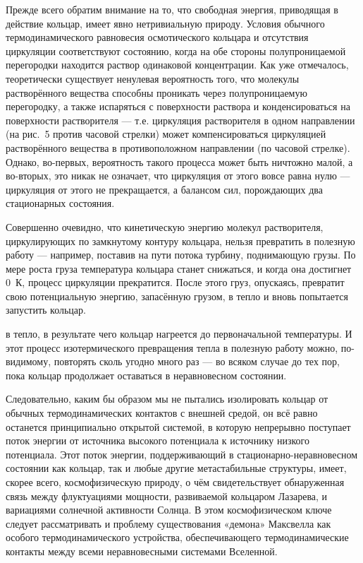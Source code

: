 \documentclass[12pt,a4paper]{article}
\begin{document}
Прежде всего обратим внимание на то, что свободная энергия, приводящая в
действие кольцар, имеет явно нетривиальную природу. Условия обычного
термодинамического равновесия осмотического кольцара и отсутствия циркуляции
соответствуют состоянию, когда на обе стороны полупроницаемой перегородки
находится раствор одинаковой концентрации. Как уже отмечалось, теоретически
существует ненулевая вероятность того, что молекулы растворённого вещества
способны проникать через полупроницаемую перегородку, а также испаряться с
поверхности раствора и конденсироваться на поверхности растворителя — т.е.
циркуляция растворителя в одном направлении (на рис.~5 против часовой стрелки)
может компенсироваться циркуляцией растворённого вещества в противоположном
направлении (по часовой стрелке). Однако, во-первых, вероятность такого
процесса может быть ничтожно малой, а во-вторых, это никак не означает, что
циркуляция от этого вовсе равна нулю — циркуляция от этого не прекращается,
а балансом сил, порождающих два стационарных состояния.

Совершенно очевидно, что кинетическую энергию молекул растворителя,
циркулирующих по замкнутому контуру кольцара, нельзя превратить в полезную
работу — например, поставив на пути потока турбину, поднимающую грузы. По
мере роста груза температура кольцара станет снижаться, и когда она достигнет
0~К, процесс циркуляции прекратится. После этого груз, опускаясь, превратит
свою потенциальную энергию, запасённую грузом, в тепло и вновь попытается
запустить кольцар.

\newpage

в тепло, в результате чего кольцар нагреется до первоначальной температуры.
И этот процесс изотермического превращения тепла в полезную работу можно,
по-видимому, повторять сколь угодно много раз — во всяком случае до тех пор,
пока кольцар продолжает оставаться в неравновесном состоянии.

Следовательно, каким бы образом мы не пытались изолировать кольцар от
обычных термодинамических контактов с внешней средой, он всё равно останется
принципиально открытой системой, в которую непрерывно поступает поток энергии
от источника высокого потенциала к источнику низкого потенциала. Этот поток
энергии, поддерживающий в стационарно-неравновесном состоянии как кольцар,
так и любые другие метастабильные структуры, имеет, скорее всего,
космофизическую природу, о чём свидетельствует обнаруженная связь между
флуктуациями мощности, развиваемой кольцаром Лазарева, и вариациями солнечной
активности Солнца. В этом космофизическом ключе следует рассматривать и
проблему существования «демона» Максвелла как особого термодинамического
устройства, обеспечивающего термодинамические контакты между всеми
неравновесными системами Вселенной.
\end{document}
